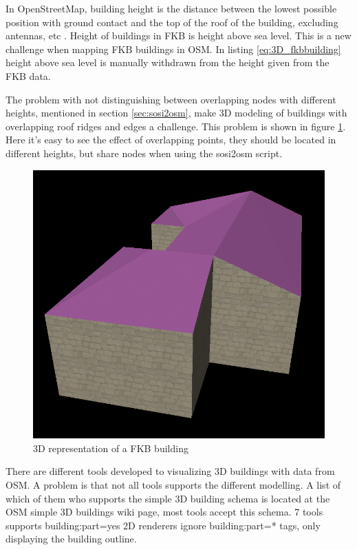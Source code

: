 In OpenStreetMap, building height is the distance between the lowest possible position with ground contact and the top of the roof of the building, excluding antennas, etc \cite{OSMwikipage2016}. Height of buildings in FKB is height above sea level. This is a new challenge when mapping FKB buildings in OSM. In listing \ref{eq:3D_fkbbuilding} height above sea level is manually withdrawn from the height given from the FKB data. 

The problem with not distinguishing between overlapping nodes with different heights, mentioned in section \ref{sec:sosi2osm}, make 3D modeling of buildings with overlapping roof ridges and edges a challenge. This problem is shown in figure \ref{fig:3DFKBbuildFail}. Here it's easy to see the effect of overlapping points, they should be located in different heights, but share nodes when using the sosi2osm script.  

\begin{figure}[H]
    \centering
    \includegraphics[scale=0.7]{figures/FixedByMe/samenode_but_have_diff_height.png}
    \caption{3D representation of a FKB building}
    \label{fig:3DFKBbuildFail}
\end{figure}

There are different tools developed to visualizing 3D buildings with data from OSM. A problem is that not all tools supports the different modelling. A list of which of them who supports the simple 3D building schema is located at the OSM simple 3D buildings wiki page, most tools accept this schema. 7 tools supports building:part=yes %
2D renderers ignore building:part=* tags, only displaying the building outline. %

